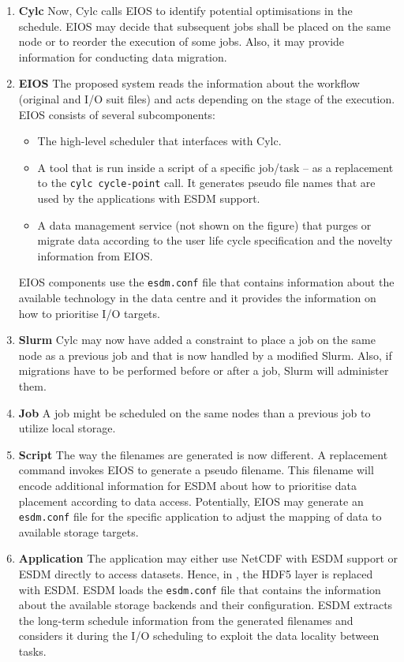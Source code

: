 \documentclass[a4paper]{article}
\begin{document}
\begin{enumerate}

  \item \textbf{Cylc}
  Now, Cylc calls EIOS to identify potential optimisations in the schedule.
  EIOS may decide that subsequent jobs shall be placed on the same node or to reorder the execution of some jobs.
  Also, it may provide information for conducting data migration.

  \item \textbf{EIOS}
  The proposed system reads the information about the workflow (original and I/O suit files) and acts depending on the stage of the execution.
  EIOS consists of several subcomponents:
    \begin{itemize}
      \item The high-level scheduler that interfaces with Cylc.
      \item A tool that is run inside a script of a specific job/task -- as a replacement to the \texttt{cylc cycle-point} call.
      It generates pseudo file names that are used by the applications with ESDM support.
      \item A data management service (not shown on the figure) that purges or migrate data according to the user life cycle specification and the novelty information from EIOS.
    \end{itemize}
  EIOS components use the \texttt{esdm.conf} file that contains information about the available technology in the data centre and it provides the information on how to prioritise I/O targets.


  \item \textbf{Slurm}
  Cylc may now have added a constraint to place a job on the same node as a previous job and that is now handled by a modified Slurm.
  Also, if migrations have to be performed before or after a job, Slurm will administer them.

  \item \textbf{Job}
  A job might be scheduled on the same nodes than a previous job to utilize local storage.

  \item \textbf{Script}
  The way the filenames are generated is now different. A replacement command invokes EIOS to generate a pseudo filename.
  This filename will encode additional information for ESDM about how to prioritise data placement according to data access.
  Potentially, EIOS may generate an \texttt{esdm.conf} file for the specific application to adjust the mapping of data to available storage targets.

  \item \textbf{Application}
  The application may either use NetCDF with ESDM support or ESDM directly to access datasets.
  Hence, in , the HDF5 layer is replaced with ESDM.
  ESDM loads the \texttt{esdm.conf} file that contains the information about the available storage backends and their configuration.
  ESDM extracts the long-term schedule information from the generated filenames and considers it during the I/O scheduling to exploit the data locality between tasks.

\end{enumerate}
\end{document}
